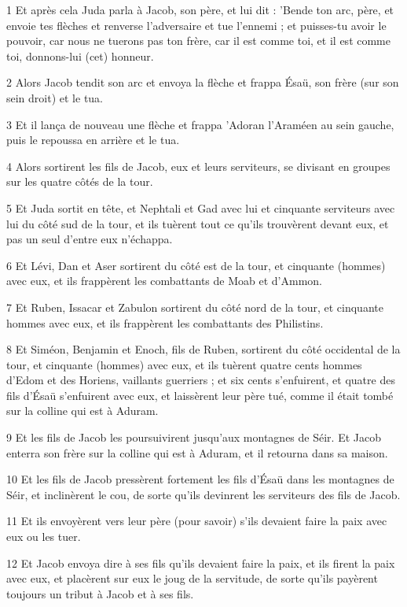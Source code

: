 \par 1 Et après cela Juda parla à Jacob, son père, et lui dit : 'Bende ton arc, père, et envoie tes flèches et renverse l'adversaire et tue l'ennemi ; et puisses-tu avoir le pouvoir, car nous ne tuerons pas ton frère, car il est comme toi, et il est comme toi, donnons-lui (cet) honneur.
\par 2 Alors Jacob tendit son arc et envoya la flèche et frappa Ésaü, son frère (sur son sein droit) et le tua.
\par 3 Et il lança de nouveau une flèche et frappa 'Adoran l'Araméen au sein gauche, puis le repoussa en arrière et le tua.
\par 4 Alors sortirent les fils de Jacob, eux et leurs serviteurs, se divisant en groupes sur les quatre côtés de la tour.
\par 5 Et Juda sortit en tête, et Nephtali et Gad avec lui et cinquante serviteurs avec lui du côté sud de la tour, et ils tuèrent tout ce qu'ils trouvèrent devant eux, et pas un seul d'entre eux n'échappa.
\par 6 Et Lévi, Dan et Aser sortirent du côté est de la tour, et cinquante (hommes) avec eux, et ils frappèrent les combattants de Moab et d'Ammon.
\par 7 Et Ruben, Issacar et Zabulon sortirent du côté nord de la tour, et cinquante hommes avec eux, et ils frappèrent les combattants des Philistins.
\par 8 Et Siméon, Benjamin et Enoch, fils de Ruben, sortirent du côté occidental de la tour, et cinquante (hommes) avec eux, et ils tuèrent quatre cents hommes d'Edom et des Horiens, vaillants guerriers ; et six cents s'enfuirent, et quatre des fils d'Ésaü s'enfuirent avec eux, et laissèrent leur père tué, comme il était tombé sur la colline qui est à Aduram.
\par 9 Et les fils de Jacob les poursuivirent jusqu'aux montagnes de Séir. Et Jacob enterra son frère sur la colline qui est à Aduram, et il retourna dans sa maison.
\par 10 Et les fils de Jacob pressèrent fortement les fils d'Ésaü dans les montagnes de Séir, et inclinèrent le cou, de sorte qu'ils devinrent les serviteurs des fils de Jacob.
\par 11 Et ils envoyèrent vers leur père (pour savoir) s'ils devaient faire la paix avec eux ou les tuer.
\par 12 Et Jacob envoya dire à ses fils qu'ils devaient faire la paix, et ils firent la paix avec eux, et placèrent sur eux le joug de la servitude, de sorte qu'ils payèrent toujours un tribut à Jacob et à ses fils.
